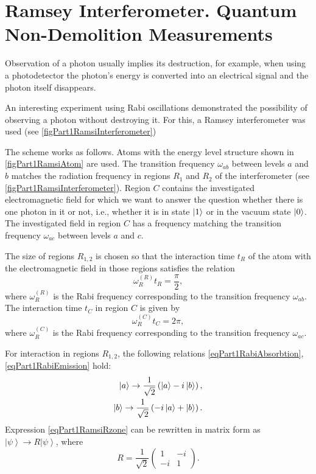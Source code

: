 \section{Ramsey Interferometer. Quantum Non-Demolition Measurements}

Observation of a photon  usually implies its destruction, for example, when using a photodetector the photon's energy is converted into an electrical signal and the photon itself disappears.

An interesting experiment \cite{Nogues1999Nv400p239} using Rabi oscillations demonstrated the possibility of observing a photon without destroying it. For this, a Ramsey interferometer was used (see \autoref{figPart1RamsiInterferometer})





The scheme works as follows. Atoms with the energy level structure shown in \autoref{figPart1RamsiAtom} are used. The transition frequency $\omega_{ab}$ between levels $a$ and $b$ matches the radiation frequency in regions $R_1$ and $R_2$ of the interferometer (see \autoref{figPart1RamsiInterferometer}). Region $C$ contains the investigated electromagnetic field for which we want to answer the question whether there is one photon in it or not, i.e., whether it is in state $\ket{1}$ or in the vacuum state $\ket{0}$. The investigated field in region $C$ has a frequency matching the transition frequency $\omega_{ac}$ between levels $a$ and $c$.

The size of regions $R_{1,2}$ is chosen so that the interaction time $t_R$ of the atom with the electromagnetic field in those regions satisfies the relation
\begin{equation}
  \omega_R^{(R)} t_R = \frac{\pi}{2},
  \nonumber
\end{equation}
where $\omega_R^{(R)}$ is the Rabi frequency corresponding to the transition frequency $\omega_{ab}$. The interaction time $t_C$ in region $C$ is given by
\begin{equation}
  \omega_R^{(C)} t_C = 2 \pi,
  \nonumber
\end{equation}
where $\omega_R^{(C)}$ is the Rabi frequency corresponding to the transition frequency $\omega_{ac}$.

For interaction in regions $R_{1,2}$, the following relations \eqref{eqPart1RabiAbsorbtion}, \ref{eqPart1RabiEmission} hold:
\begin{eqnarray}
  \ket{a} \rightarrow \frac{1}{\sqrt{2}}\left(
  \ket{a} - i \ket{b}  
  \right),
  \nonumber \\
  \ket{b} \rightarrow \frac{1}{\sqrt{2}}\left(
  -i \ket{a} + \ket{b}  
  \right).
  \label{eqPart1RamsiRzone}
\end{eqnarray}
Expression \eqref{eqPart1RamsiRzone} can be rewritten in matrix form as $\left|\psi\right> \rightarrow R \left|\psi\right>$, where
\[
R = \frac{1}{\sqrt{2}} \left(
\begin{array} {cc}
1 & -i
\\
-i & 1 
\end{array}
\right).
\]

